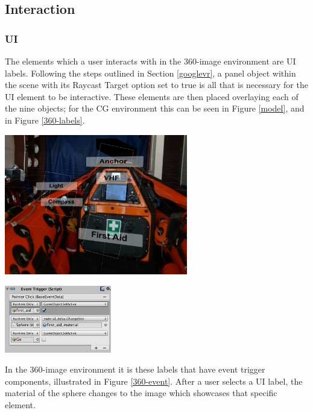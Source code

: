 \documentclass[ %
                    author={Elis Jones},
                supervisor={Dr. Kirsten Cater},
                    degree={BSc},
                     title={The Effect of Presentation Medium on Spatial Cognition},
                  subtitle={in the Virtual Environment},
                      year={2018} ]{dissertation}
\begin{document}
\subsection{Interaction}\label{interaction}

\subsubsection{UI}
The elements which a user interacts with in the 360-image environment are UI labels. Following the steps outlined in Section \ref{googlevr}, a panel object within the scene with its Raycast Target option set to true is all that is necessary for the UI element to be interactive. These elements are then placed overlaying each of the nine objects; for the CG environment this can be seen in Figure \ref{model}, and in Figure \ref{360-labels}. 

\begin{minipage}{\textwidth}
    \centering
    \includegraphics[width=0.6\textwidth]{images/360-labels.png}
    \label{360-labels}
\end{minipage}
    

\begin{minipage}{\textwidth}
    \centering
    \includegraphics[width=0.35\textwidth]{images/360-event-component.png}
    \label{360-event}
\end{minipage}


In the 360-image environment it is these labels that have event trigger components, illustrated in Figure \ref{360-event}. After a user selects a UI label, the material of the sphere changes to the image which showcases that specific element.
\end{document}
